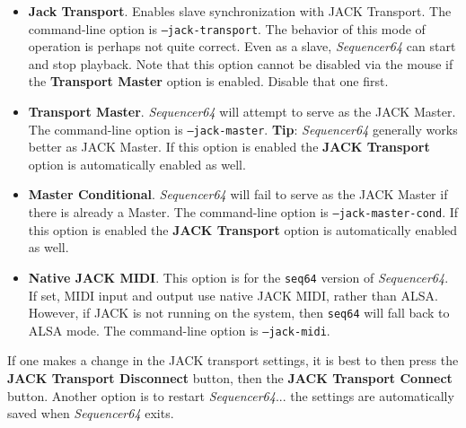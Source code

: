    \begin{itemize}
      \item \textbf{Jack Transport}.
         Enables slave synchronization with JACK Transport.
         The command-line option is \texttt{--jack-transport}.
         The behavior of this mode of operation is perhaps not quite
         correct.  Even as a slave, \textsl{Sequencer64} can start and
         stop playback.
         Note that this option cannot be disabled via the mouse if the
         \textbf{Transport Master} option is enabled.  Disable that one first.
      \item \textbf{Transport Master}.
         \textsl{Sequencer64} will attempt to serve as the JACK Master.
         The command-line option is \texttt{--jack-master}.
         \textbf{Tip}:
         \textsl{Sequencer64} generally works better as JACK Master.
         If this option is enabled the \textbf{JACK Transport} option is
         automatically enabled as well.
      \item \textbf{Master Conditional}.
         \textsl{Sequencer64} will fail to serve as the JACK Master if there is
         already a Master.
         The command-line option is \texttt{--jack-master-cond}.
         If this option is enabled the \textbf{JACK Transport} option is
         automatically enabled as well.
      \item \textbf{Native JACK MIDI}.
         This option is for the \texttt{seq64} version of
         \textsl{Sequencer64}.
         If set, MIDI input and output use native JACK MIDI,
         rather than ALSA.  However, if JACK is not running on the
         system, then \texttt{seq64} will fall back to ALSA mode.
         The command-line option is \texttt{--jack-midi}.
   \end{itemize}


   If one makes a change in the JACK transport settings, it is best to
   then press the \textbf{JACK Transport Disconnect} button, then the
   \textbf{JACK Transport Connect} button.  Another option is to restart
   \textsl{Sequencer64}... the settings are automatically saved when
   \textsl{Sequencer64} exits.

